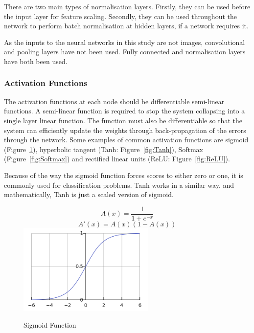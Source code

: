There are two main types of normalisation layers. Firstly, they can be used before the input layer for feature scaling\cite{LeCun_backprop}. Secondly, they can be used throughout the network to perform batch normalisation at hidden layers, if a network requires it.

As the inputs to the neural networks in this study are not images, convolutional and pooling layers have not been used. Fully connected and normalisation layers have both been used.

\subsubsection{Activation Functions}

The activation functions at each node should be differentiable semi-linear functions\cite{Rumelhart_error_propagation}. A semi-linear function is required to stop the system collapsing into a single layer linear function\cite{understand_ml}. The function must also be differentiable so that the system can efficiently update the weights through back-propagation of the errors through the network\cite{Rumelhart_error_propagation}. Some examples of common activation functions are sigmoid (Figure~\ref{fig:Sigmoid}), hyperbolic tangent (Tanh: Figure~\ref{fig:Tanh}), Softmax (Figure~\ref{fig:Softmax}) and rectified linear units (ReLU: Figure~\ref{fig:ReLU}).

Because of the way the sigmoid function forces scores to either zero or one, it is commonly used for classification problems. Tanh works in a similar way, and mathematically, Tanh is just a scaled version of sigmoid.

\begin{figure}[H]
\caption{Sigmoid Function}
\label{fig:Sigmoid}
\centering
\begin{equation}
A(x)=\frac{1}{1+e^{-x}}
\end{equation}
\begin{equation}
A'(x)=A(x)(1-A(x))
\end{equation}
\includegraphics[width=0.6\textwidth]{Figures/Sigmoid2.png}
\end{figure}

